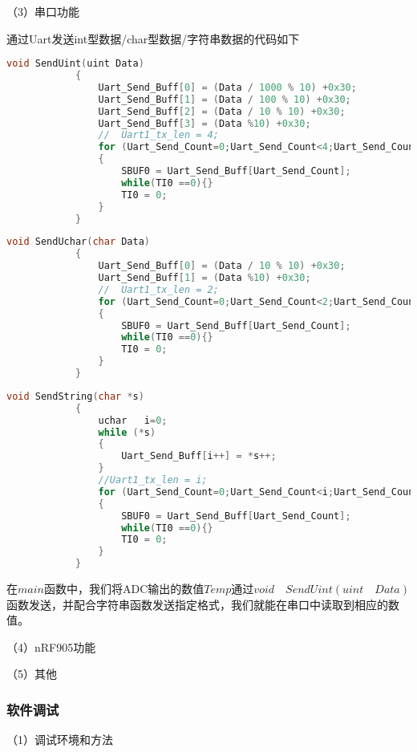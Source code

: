 \documentclass{zjureport}
\begin{document}
	（3）串口功能  
	            
	       通过Uart发送int型数据/char型数据/字符串数据的代码如下
	       \begin{lstlisting}[language=C]
	       	void SendUint(uint Data)
	       	{
	       		Uart_Send_Buff[0] = (Data / 1000 % 10) +0x30;
	       		Uart_Send_Buff[1] = (Data / 100 % 10) +0x30;
	       		Uart_Send_Buff[2] = (Data / 10 % 10) +0x30;
	       		Uart_Send_Buff[3] = (Data %10) +0x30;
	       		//	Uart1_tx_len = 4;
	       		for (Uart_Send_Count=0;Uart_Send_Count<4;Uart_Send_Count++)
	       		{
	       			SBUF0 = Uart_Send_Buff[Uart_Send_Count];
	       			while(TI0 ==0){}
	       			TI0 = 0;
	       		}
	       	}
	       	\end{lstlisting}
	       
	       \begin{lstlisting}[language=C]
	       	void SendUchar(char Data)
	       	{
	       		Uart_Send_Buff[0] = (Data / 10 % 10) +0x30;
	       		Uart_Send_Buff[1] = (Data %10) +0x30;
	       		//	Uart1_tx_len = 2;
	       		for (Uart_Send_Count=0;Uart_Send_Count<2;Uart_Send_Count++)
	       		{
	       			SBUF0 = Uart_Send_Buff[Uart_Send_Count];
	       			while(TI0 ==0){}
	       			TI0 = 0;
	       		}
	       	}
	       \end{lstlisting}
	       
	        \begin{lstlisting}[language=C]
	       	void SendString(char *s)
	       	{
	       		uchar	i=0;
	       		while (*s)
	       		{
	       			Uart_Send_Buff[i++] = *s++;
	       		}
	       		//Uart1_tx_len = i;
	       		for (Uart_Send_Count=0;Uart_Send_Count<i;Uart_Send_Count++)
	       		{
	       			SBUF0 = Uart_Send_Buff[Uart_Send_Count];
	       			while(TI0 ==0){}
	       			TI0 = 0;
	       		}
	       	}
	       \end{lstlisting}
	       
	       在$main$函数中，我们将ADC输出的数值$Temp$通过$void \quad SendUint(uint \quad Data)$函数发送，并配合字符串函数发送指定格式，我们就能在串口中读取到相应的数值。
	               
	（4）nRF905功能            
	            
	（5）其他
	
	
	\subsubsection{软件调试}
	
	（1）调试环境和方法
	
\end{document}
